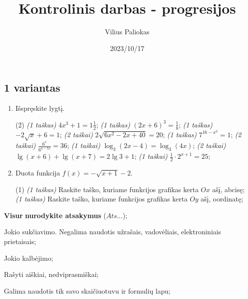 \documentclass[a4paper]{article}
\title{Kontrolinis darbas - progresijos}
\author{Vilius Paliokas}
\date{2023/10/17}
\begin{document}
\thispagestyle{fancy}

\titlespacing*{\subsection}{0pt}{.75ex}{0.75ex}

\subsection*{1 variantas}

\begin{enumerate}
      \item Išspręskite lygtį.

            \begin{tasks}[item-format={\normalfont}, after-item-skip=2mm](2)
                  \task \textit{(1 taškas)} $4x^3+1=1\frac{1}{2}$;
                  \task \textit{(1 taškas)} $(2x+6)^3=\frac{1}{8}$;
                  \task \textit{(1 taškas)} $-2\sqrt{x}+6=1$;
                  \task \textit{(2 taškai)} $2\sqrt{6x^2-2x+40}=20$;
                  \task \textit{(1 taškas)} $7^{16-x^2}=1$;
                  \task \textit{(2 taškai)} $\frac{6^x}{6^{4-5x}}=36$;
                  \task \textit{(1 taškai)} $\log_3(2x-4)=\log_3(4x)$;
                  \task \textit{(2 taškai)} $\lg(x+6)+\lg(x+7)=2\lg3+1$;
                  \task \textit{(1 taškai)} $\frac{1}{2}\cdot 2^{x+1}=25$;
            \end{tasks}

      \item Duota funkcija $f(x)=-\sqrt{x+1}-2$.
            \begin{tasks}[item-format={\normalfont}, after-item-skip=2mm](1)
                  \task \textit{(1 taškas)} Raskite taško, kuriame funkcijos grafikas kerta $Ox$ ašį, abcisę;
                  \task \textit{(1 taškas)} Raskite taško, kuriame funkcijos grafikas kerta $Oy$ ašį, oordinatę;
            \end{tasks}
\end{enumerate}

\begin{small}
      \begin{enumerate*}[label={(\arabic*)}]
            \item \textbf{Visur} \textbf{nurodykite atsakymus} ($Ats\ldots$);
            \item Jokio sukčiavimo. Negalima naudotis užrašais, vadovėliais,
            elektroniniais prietaisais;
            \item Jokio kalbėjimo;
            \item Rašyti aiškiai, nedviprasmiškai;
            \item Galima naudotis tik savo skaičiuotuvu ir formulių lapu;
      \end{enumerate*}
\end{small}
\end{document}
